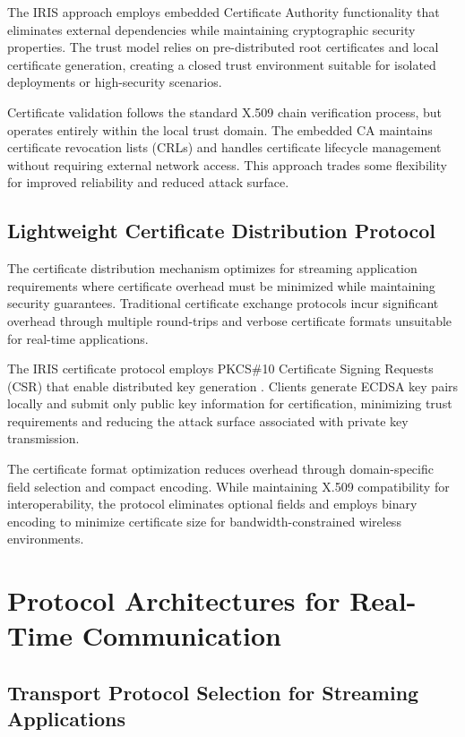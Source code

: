 The IRIS approach employs embedded Certificate Authority functionality that eliminates external dependencies while maintaining cryptographic security properties. The trust model relies on pre-distributed root certificates and local certificate generation, creating a closed trust environment suitable for isolated deployments or high-security scenarios.

Certificate validation follows the standard X.509 chain verification process, but operates entirely within the local trust domain. The embedded CA maintains certificate revocation lists (CRLs) and handles certificate lifecycle management without requiring external network access. This approach trades some flexibility for improved reliability and reduced attack surface.

\subsection{Lightweight Certificate Distribution Protocol}

The certificate distribution mechanism optimizes for streaming application requirements where certificate overhead must be minimized while maintaining security guarantees. Traditional certificate exchange protocols incur significant overhead through multiple round-trips and verbose certificate formats unsuitable for real-time applications.

The IRIS certificate protocol employs PKCS\#10 Certificate Signing Requests (CSR) that enable distributed key generation \cite{nystrom2000pkcs}. Clients generate ECDSA key pairs locally and submit only public key information for certification, minimizing trust requirements and reducing the attack surface associated with private key transmission.

The certificate format optimization reduces overhead through domain-specific field selection and compact encoding. While maintaining X.509 compatibility for interoperability, the protocol eliminates optional fields and employs binary encoding to minimize certificate size for bandwidth-constrained wireless environments.

\section{Protocol Architectures for Real-Time Communication}

\subsection{Transport Protocol Selection for Streaming Applications}

